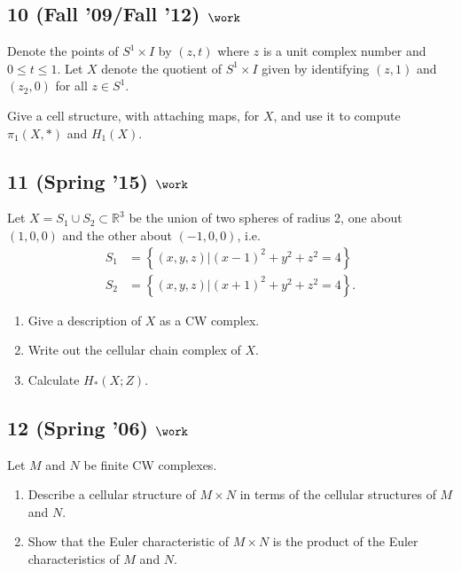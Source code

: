 \hypertarget{fall-09fall-12-work}{%
\subsection{\texorpdfstring{10 (Fall '09/Fall '12)
\(\work\)}{10 (Fall '09/Fall '12) \textbackslash work}}\label{fall-09fall-12-work}}

Denote the points of \(S^1 \times I\) by \((z, t)\) where \(z\) is a
unit complex number and \(0 \leq t \leq 1\). Let \(X\) denote the
quotient of \(S^1 \times I\) given by identifying \((z, 1)\) and
\((z_2 , 0)\) for all \(z \in S^1\).

Give a cell structure, with attaching maps, for \(X\), and use it to
compute \(\pi_1 (X, \ast)\) and \(H_1 (X)\).

\hypertarget{spring-15-work-2}{%
\subsection{\texorpdfstring{11 (Spring '15)
\(\work\)}{11 (Spring '15) \textbackslash work}}\label{spring-15-work-2}}

Let \(X = S_1 \cup S_2 \subset {\mathbb{R}}^3\) be the union of two
spheres of radius 2, one about \((1, 0, 0)\) and the other about
\((-1, 0, 0)\), i.e.~
\begin{align*}  
S_1 &= \left\{{(x, y,z) \mathrel{\Big|}(x-1)^2 + y^2 +z^2 = 4}\right\} \\
S_2 &= \left\{{(x, y, z) \mathrel{\Big|}(x + 1)^2 + y^2 + z^2 = 4}\right\}
.\end{align*}

\begin{enumerate}
\def\labelenumi{\alph{enumi}.}
\item
  Give a description of \(X\) as a CW complex.
\item
  Write out the cellular chain complex of \(X\).
\item
  Calculate \(H_* (X; Z)\).
\end{enumerate}

\hypertarget{spring-06-work-5}{%
\subsection{\texorpdfstring{12 (Spring '06)
\(\work\)}{12 (Spring '06) \textbackslash work}}\label{spring-06-work-5}}

Let \(M\) and \(N\) be finite CW complexes.

\begin{enumerate}
\def\labelenumi{\alph{enumi}.}
\item
  Describe a cellular structure of \(M \times N\) in terms of the
  cellular structures of \(M\) and \(N\).
\item
  Show that the Euler characteristic of \(M \times N\) is the product of
  the Euler characteristics of \(M\) and \(N\).
\end{enumerate}

